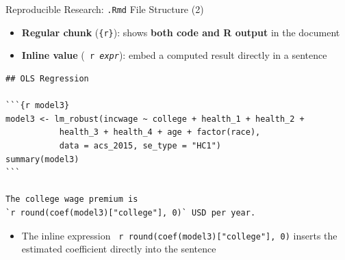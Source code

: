 \documentclass[dvipsnames,hyperref={pdfpagelabels=false}]{beamer}
\begin{document}
\begin{frame}[fragile]{Reproducible Research: \texttt{.Rmd} File Structure (2)}

	\begin{itemize}
		\item \textbf{Regular chunk} (\texttt{\{r\}}): shows \textbf{both code and R output} in the document
		\vspace{0.2cm}
		\item \textbf{Inline value} (\texttt{{} r \textit{expr}{}}): embed a computed result directly in a sentence
	\end{itemize}

\begin{lstlisting}[language={},basicstyle=\ttfamily\fontsize{7.5}{9}\selectfont,keywordstyle={}]
## OLS Regression

```{r model3}
model3 <- lm_robust(incwage ~ college + health_1 + health_2 +
           health_3 + health_4 + age + factor(race),
           data = acs_2015, se_type = "HC1")
summary(model3)
```

The college wage premium is
`r round(coef(model3)["college"], 0)` USD per year.
\end{lstlisting}

	\begin{itemize}
		\item The inline expression \texttt{{} r round(coef(model3)["college"], 0){}} inserts the estimated coefficient directly into the sentence 
        
	\end{itemize}

\end{frame}
\end{document}
